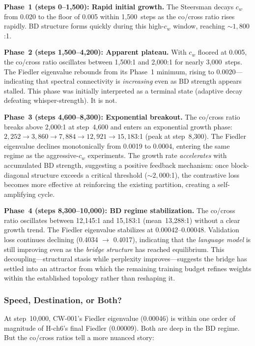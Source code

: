 \textbf{Phase~1 (steps 0--1{,}500): Rapid initial growth.}
The Steersman decays $c_w$ from 0.020 to the floor of 0.005 within
1{,}500~steps as the co/cross ratio rises rapidly. BD structure forms
quickly during this high-$c_w$ window, reaching ${\sim}1{,}800$:1.

\textbf{Phase~2 (steps 1{,}500--4{,}200): Apparent plateau.}
With $c_w$ floored at 0.005, the co/cross ratio oscillates between
1{,}500:1 and 2{,}000:1 for nearly 3{,}000~steps. The Fiedler
eigenvalue rebounds from its Phase~1 minimum, rising to 0.0020---indicating
that spectral connectivity is \emph{increasing} even as BD strength
appears stalled. This phase was initially interpreted as a terminal
state (adaptive decay defeating whisper-strength). It is not.

\textbf{Phase~3 (steps 4{,}600--8{,}300): Exponential breakout.}
The co/cross ratio breaks above 2{,}000:1 at step~4{,}600 and enters an
exponential growth phase: $2{,}252 \to 3{,}860 \to 7{,}884 \to 12{,}921
\to 15{,}183$:1 (peak at step~8{,}300). The Fiedler eigenvalue declines
monotonically from 0.0019 to 0.0004, entering the same regime as the
aggressive-$c_w$ experiments. The growth rate \emph{accelerates} with
accumulated BD strength, suggesting a positive feedback mechanism: once
block-diagonal structure exceeds a critical threshold (${\sim}2{,}000$:1),
the contrastive loss becomes more effective at reinforcing the existing
partition, creating a self-amplifying cycle.

\textbf{Phase~4 (steps 8{,}300--10{,}000): BD regime stabilization.}
The co/cross ratio oscillates between 12{,}145:1 and 15{,}183:1
(mean~13{,}288:1) without a clear growth trend. The Fiedler eigenvalue
stabilizes at 0.00042--0.00048. Validation loss continues declining
(0.4034 $\to$ 0.4017), indicating that the \emph{language model} is still
improving even as the \emph{bridge structure} has reached equilibrium.
This decoupling---structural stasis while perplexity improves---suggests
the bridge has settled into an attractor from which the remaining
training budget refines weights within the established topology rather
than reshaping it.

\subsubsection{Speed, Destination, or Both?}

At step~10{,}000, CW-001's Fiedler eigenvalue (0.00046) is within one
order of magnitude of H-ch6's final Fiedler (0.00009). Both are deep
in the BD regime. But the co/cross ratios tell a more nuanced story:


